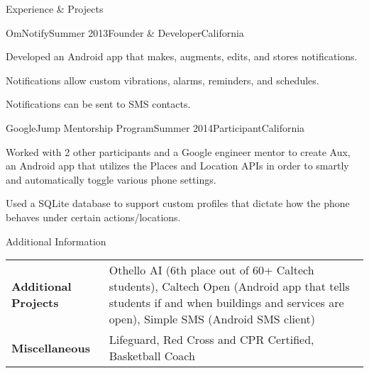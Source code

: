 \documentclass{resume} %
\begin{document}
\begin{rSection}{Experience \& Projects}

\begin{rSubsection}{OmNotify}{Summer 2013}{Founder \& Developer}{California}
\item Developed an Android app that makes, augments, edits, and stores notifications.
\item Notifications allow custom vibrations, alarms, reminders, and schedules.
\item Notifications can be sent to SMS contacts.
\end{rSubsection}


\begin{rSubsection}{GoogleJump Mentorship Program}{Summer 2014}{Participant}{California}
\item Worked with 2 other participants and a Google engineer mentor to create Aux,
    an Android app that utilizes the Places and Location APIs in order to smartly
    and automatically toggle various phone settings.
\item Used a SQLite database to support custom profiles that dictate how the phone behaves
    under certain actions/locations.
\end{rSubsection}

\end{rSection}




\begin{rSection}{Additional Information}

\noindent\begin{tabularx}{.98\textwidth}{@{}lX}
    \bfseries{Additional Projects}   &  Othello AI (6th place out of 60+ Caltech
    students), Caltech Open (Android app that tells students if and when
    buildings and services are open), Simple SMS (Android SMS client) \\
    \bfseries{Miscellaneous}   &  Lifeguard, Red Cross and CPR Certified, Basketball
    Coach \\
\end{tabularx}

\end{rSection}
\end{document}
